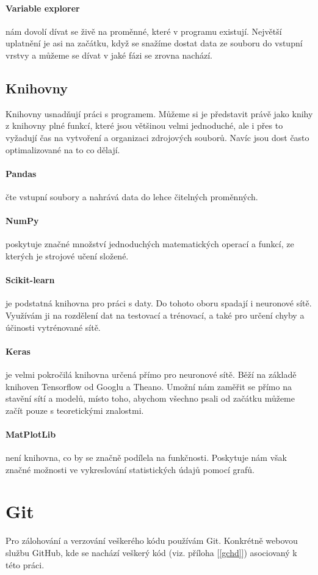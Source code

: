 \documentclass[12pt,a4paper]{report}
\begin{document}
		\paragraph{Variable explorer}
		nám dovolí dívat se živě na proměnné, které v programu existují. Největší uplatnění je asi na začátku, když se snažíme dostat data ze souboru do vstupní vrstvy a můžeme se dívat v jaké fázi se zrovna nachází.
		\subsection{Knihovny}
		Knihovny usnadňují práci s programem. Můžeme si je představit právě jako knihy z knihovny plné funkcí, které jsou většinou velmi jednoduché, ale i přes to vyžadují čas na vytvoření a organizaci zdrojových souborů. Navíc jsou dost často optimalizované na to co dělají.
			\paragraph{Pandas}
			čte vstupní soubory a nahrává data do lehce čitelných proměnných.
			\paragraph{NumPy}
			poskytuje značné množství jednoduchých matematických operací a funkcí, ze kterých je strojové učení složené.
			\paragraph{Scikit-learn}
			je podstatná knihovna pro práci s daty. Do tohoto oboru spadají i neuronové sítě. Využívám ji na rozdělení dat na testovací a trénovací, a také pro určení chyby a účinosti vytrénované sítě.
			\paragraph{Keras}
			je velmi pokročilá knihovna určená přímo pro neuronové sítě. Běží na základě knihoven Tensorflow od Googlu a Theano. Umožní nám zaměřit se přímo na stavění sítí a modelů, místo toho, abychom všechno psali od začátku můžeme začít pouze s teoretickými znalostmi.
			\paragraph{MatPlotLib}
			není knihovna, co by se značně podílela na funkčnosti. Poskytuje nám však značné možnosti ve vykreslování statistických údajů pomocí grafů.
	\section{Git}
		Pro zálohování a verzování veškerého kódu používám Git. Konkrétně webovou službu GitHub, kde se nachází veškerý kód (viz. příloha [\ref{gchd}]) asociovaný k této práci.
		
\end{document}

